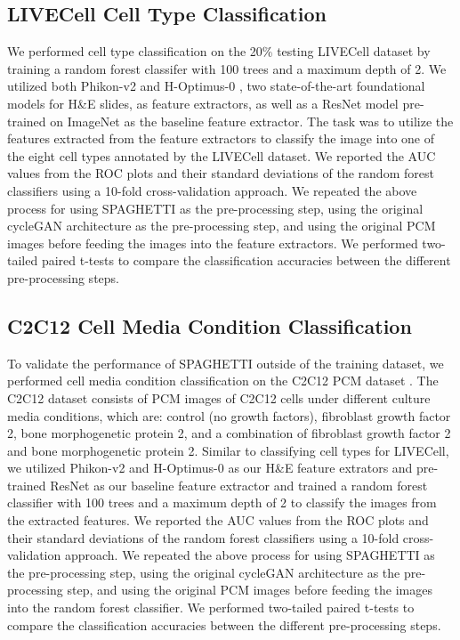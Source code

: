 \begin{refsegment}
\subsection*{LIVECell Cell Type Classification}
We performed cell type classification on the 20\% testing LIVECell dataset by training a random forest classifer with 100 trees and a maximum depth of 2. We utilized both Phikon-v2 and H-Optimus-0 \autocite{hoptimus0}, two state-of-the-art foundational models for H\&E slides, as feature extractors, as well as a ResNet model pre-trained on ImageNet as the baseline feature extractor. The task was to utilize the features extracted from the feature extractors to classify the image into one of the eight cell types annotated by the LIVECell dataset. We reported the AUC values from the ROC plots and their standard deviations of the random forest classifiers using a 10-fold cross-validation approach. We repeated the above process for using SPAGHETTI as the pre-processing step, using the original cycleGAN architecture as the pre-processing step, and using the original PCM images before feeding the images into the feature extractors. We performed two-tailed paired t-tests to compare the classification accuracies between the different pre-processing steps. 

\subsection*{C2C12 Cell Media Condition Classification}
To validate the performance of SPAGHETTI outside of the training dataset, we performed cell media condition classification on the C2C12 PCM dataset \autocite{c2c12}. The C2C12 dataset consists of PCM images of C2C12 cells under different culture media conditions, which are: control (no growth factors), fibroblast growth factor 2, bone morphogenetic protein 2, and a combination of fibroblast growth factor 2 and bone morphogenetic protein 2. Similar to classifying cell types for LIVECell, we utilized Phikon-v2 and H-Optimus-0 as our H\&E feature extrators and pre-trained ResNet as our baseline feature extractor and trained a random forest classifier with 100 trees and a maximum depth of 2 to classify the images from the extracted features. We reported the AUC values from the ROC plots and their standard deviations of the random forest classifiers using a 10-fold cross-validation approach. We repeated the above process for using SPAGHETTI as the pre-processing step, using the original cycleGAN architecture as the pre-processing step, and using the original PCM images before feeding the images into the random forest classifier. We performed two-tailed paired t-tests to compare the classification accuracies between the different pre-processing steps.  


\end{refsegment}
